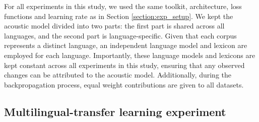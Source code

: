 For all experiments in this study, we used the same toolkit, architecture, loss functions and learning rate as in Section \ref{section:exp_setup}. We kept the acoustic model divided into two parts: the first part is shared across all languages, and the second part is language-specific. Given that each corpus represents a distinct language, an independent language model and lexicon are employed for each language. Importantly, these language models and lexicons are kept constant across all experiments in this study, ensuring that any observed changes can be attributed to the acoustic model. Additionally, during the backpropagation process, equal weight contributions are given to all datasets.


\subsection{Multilingual-transfer learning experiment}

